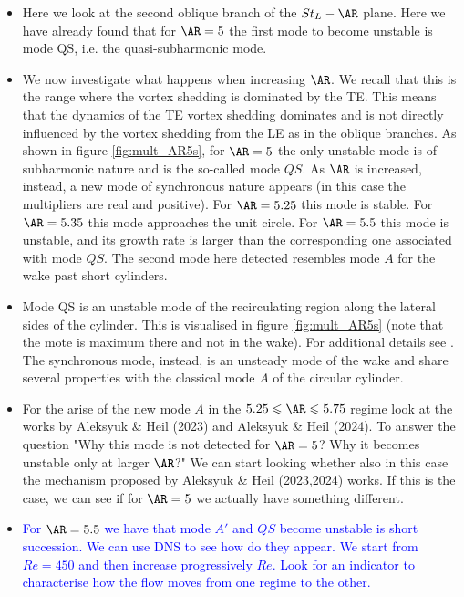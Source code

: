 \begin{itemize}
  \item Here we look at the second oblique branch of the $St_L-\AR$ plane. Here we have already found that for $\AR=5$ the first mode to become unstable is mode QS, i.e. the quasi-subharmonic mode.
  \item We now investigate what happens when increasing $\AR$. We recall that this is the range where the vortex shedding is dominated by the TE. This means that the dynamics of the TE vortex shedding dominates and is not directly influenced by the vortex shedding from the LE as in the oblique branches. As shown in figure \ref{fig:mult_AR5s}, for $\AR=5$ the only unstable mode is of subharmonic nature and is the so-called mode $QS$. As $\AR$ is increased, instead, a new mode of synchronous nature appears (in this case the multipliers are real and positive). For $\AR=5.25$ this mode is stable. For $\AR=5.35$ this mode approaches the unit circle. For $\AR=5.5$ this mode is unstable, and its growth rate is larger than the corresponding one associated with mode $QS$. The second mode here detected resembles mode $A$ for the wake past short cylinders. 
  \item Mode QS is an unstable mode of the recirculating region along the lateral sides of the cylinder. This is visualised in figure \ref{fig:mult_AR5s} (note that the mote is maximum there and not in the wake). For additional details see \citep{chiarini-etal-2022}. The synchronous mode, instead, is an unsteady mode of the wake and share several properties with the classical mode $A$ of the circular cylinder.
  \item For the arise of the new mode $A$ in the $5.25 \le \AR \le 5.75$ regime look at the works by Aleksyuk \& Heil (2023) and Aleksyuk \& Heil (2024). To answer the question "Why this mode is not detected for $\AR=5$? Why it becomes unstable only at larger $\AR$?" We can start looking whether also in this case the mechanism proposed by Aleksyuk \& Heil (2023,2024) works. If this is the case, we can see if for $\AR=5$ we actually have something different. 
  \item \textcolor{blue}{For $\AR=5.5$ we have that mode $A'$ and $QS$ become unstable is short succession. We can use DNS to see how do they appear. We start from $Re=450$ and then increase progressively $Re$. Look for an indicator to characterise how the flow moves from one regime to the other.}
\end{itemize}

